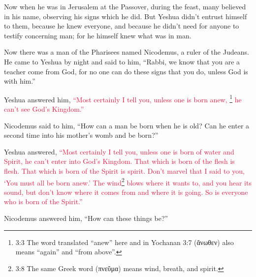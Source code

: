 \myverse{}Now when he was in Jerusalem at the Passover, during the feast,
many believed in his name, observing his signs which he did.
\myverse{}But Yeshua didn’t entrust himself to them, because he knew everyone,
\myverse{}and because he didn’t need for anyone to testify concerning man; for he himself
knew what was in man.


\mychapter{} \myverse*{}Now there was a man of the Pharisees named Nicodemus, a ruler of the Judeans.
\myverse{}He came to Yeshua by night and said to him, “Rabbi, we know that you are a teacher
come from God, for no one can do these signs that you do, unless God is with him.”

\myverse{}Yeshua answered him,
\textcolor{crimson}{“Most certainly I tell you, unless one is born anew,
}\footnote{3:3 The word translated “anew” here and in
	Yochanan 3:7 (ἄνωθεν) also means “again” and “from above”.}
\textcolor{crimson}{he can’t see God’s Kingdom.”}

\myverse{}Nicodemus said to him, “How can a man be born when he is old? Can
he enter a second time into his mother’s womb and be born?”

\myverse{}Yeshua answered,
\textcolor{crimson}{“Most certainly I tell you, unless one is born of water and Spirit, he can’t enter into God’s Kingdom.}
\myverse{}\textcolor{crimson}{That which is born of the flesh is flesh. That which is born of the Spirit
	is spirit.
}
\myverse{}\textcolor{crimson}{Don’t marvel that I said to you, ‘You must all be born anew.’
}
\myverse{}\textcolor{crimson}{The wind}\footnote{3:8 The same Greek word (πνεῦμα) means wind, breath, and spirit.}
\textcolor{crimson}{blows where it wants to, and you hear its sound, but don’t know where it comes from and where it is
	going. So is everyone who is born of the Spirit.”}

\myverse{}Nicodemus answered him, “How can these things be?”


